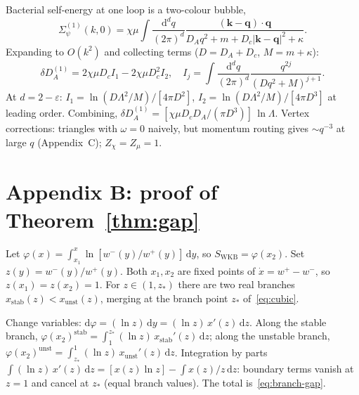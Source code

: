 \documentclass[11pt,a4paper]{article}
\newcommand{\dd}{\mathrm{d}}
\theoremstyle{plain}
\begin{document}
Bacterial self-energy at one loop is a two-colour bubble,
\begin{equation}
  \Sigma_\psi^{(1)}(k,0)
  = \chi\mu\!\int\!\frac{\dd^d q}{(2\pi)^d}
  \frac{(\mathbf{k}-\mathbf{q})\cdot\mathbf{q}}
  {D_A q^2 + m + D_c|\mathbf{k}-\mathbf{q}|^2 + \kappa}.
\end{equation}
Expanding to $O(k^2)$ and collecting terms
($D = D_A + D_c$, $M = m + \kappa$):
\begin{equation}
  \delta D_A^{(1)} = 2\chi\mu D_c I_1 - 2\chi\mu D_c^2 I_2,
  \quad
  I_j = \int\!\frac{\dd^d q}{(2\pi)^d}
    \frac{q^{2j}}{(Dq^2+M)^{j+1}}.
\end{equation}
At $d = 2-\varepsilon$: $I_1 = \ln(D\Lambda^2/M)/[4\pi D^2]$,
$I_2 = \ln(D\Lambda^2/M)/[4\pi D^3]$ at leading order.  Combining,
$\delta D_A^{(1)} = [\chi\mu D_c D_A/(\pi D^3)]\,\ln\Lambda$.
Vertex corrections: triangles with $\omega = 0$ naively, but
momentum routing gives $\sim q^{-3}$ at large $q$
(Appendix~C); $Z_\chi = Z_\mu = 1$.

\section*{Appendix B: proof of Theorem~\ref{thm:gap}}

Let $\varphi(x) = \int_{x_1}^x \ln[w^-(y)/w^+(y)]\,\dd y$,
so $S_{\mathrm{WKB}} = \varphi(x_2)$.  Set $z(y) = w^-(y)/w^+(y)$.
Both $x_1, x_2$ are fixed points of $\dot x = w^+ - w^-$, so
$z(x_1) = z(x_2) = 1$.  For $z \in (1, z_*)$ there are two real
branches $x_{\mathrm{stab}}(z) < x_{\mathrm{unst}}(z)$, merging at
the branch point $z_*$ of~\eqref{eq:cubic}.

Change variables: $\dd\varphi = (\ln z)\,\dd y
= (\ln z)\,x'(z)\,\dd z$.  Along the stable branch,
$\varphi(x_2)^{\mathrm{stab}} = \int_1^{z_*}(\ln z)\,x_{\mathrm{stab}}'(z)\,\dd z$;
along the unstable branch, $\varphi(x_2)^{\mathrm{unst}} =
\int_{z_*}^1(\ln z)\,x_{\mathrm{unst}}'(z)\,\dd z$.  Integration
by parts $\int (\ln z)\,x'(z)\,\dd z = [x(z)\ln z] - \int
x(z)/z\,\dd z$: boundary terms vanish at $z=1$ and cancel at
$z_*$ (equal branch values).  The total is~\eqref{eq:branch-gap}.
\end{document}
